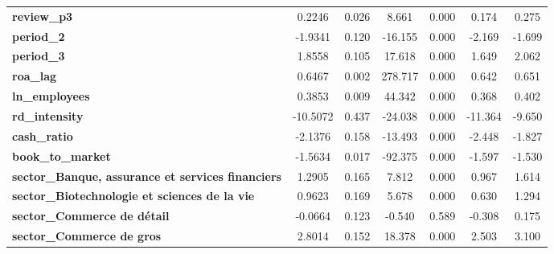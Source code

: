 \begin{center}
\begin{tabular}{lcccccc}
\textbf{review\_p3}                                                   &       0.2246  &        0.026     &     8.661  &         0.000        &        0.174    &        0.275     \\
\textbf{period\_2}                                                    &      -1.9341  &        0.120     &   -16.155  &         0.000        &       -2.169    &       -1.699     \\
\textbf{period\_3}                                                    &       1.8558  &        0.105     &    17.618  &         0.000        &        1.649    &        2.062     \\
\textbf{roa\_lag}                                                     &       0.6467  &        0.002     &   278.717  &         0.000        &        0.642    &        0.651     \\
\textbf{ln\_employees}                                                &       0.3853  &        0.009     &    44.342  &         0.000        &        0.368    &        0.402     \\
\textbf{rd\_intensity}                                                &     -10.5072  &        0.437     &   -24.038  &         0.000        &      -11.364    &       -9.650     \\
\textbf{cash\_ratio}                                                  &      -2.1376  &        0.158     &   -13.493  &         0.000        &       -2.448    &       -1.827     \\
\textbf{book\_to\_market}                                             &      -1.5634  &        0.017     &   -92.375  &         0.000        &       -1.597    &       -1.530     \\
\textbf{sector\_Banque, assurance et services financiers}             &       1.2905  &        0.165     &     7.812  &         0.000        &        0.967    &        1.614     \\
\textbf{sector\_Biotechnologie et sciences de la vie}                 &       0.9623  &        0.169     &     5.678  &         0.000        &        0.630    &        1.294     \\
\textbf{sector\_Commerce de détail}                                   &      -0.0664  &        0.123     &    -0.540  &         0.589        &       -0.308    &        0.175     \\
\textbf{sector\_Commerce de gros}                                     &       2.8014  &        0.152     &    18.378  &         0.000        &        2.503    &        3.100     \\

\end{tabular}
\end{center}
